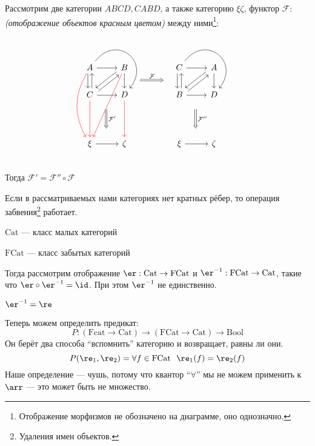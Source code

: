 \begin{example}
    Рассмотрим две категории \(ABCD, CABD\), а также категорию \(\xi\zeta\), функтор \(\mathcal{F} : \) \textit{(отображение объектов красным цветом)} между ними\footnote{Отображение морфизмов не обозначено на диаграмме, оно однозначно.}:
    \[\begin{tikzcd}
            A \arrow[red, bend right]{ddd} \arrow{r}\arrow[shift right]{d}\arrow[bend left = 90, looseness = 2]{rd} & B \arrow[red]{dddl}\arrow[shift right]{dl}\arrow{d} \arrow[Rightarrow, shift right = 6, shorten <= 1em, shorten >= 1em]{rr}{\mathcal{F}} & & C \arrow{r}\arrow[shift right]{d}\arrow[bend left = 90, looseness = 2]{rd} & A \arrow[shift right]{dl}\arrow{d} \\
            C \arrow[red]{dd}\arrow[shift right]{u}\arrow[shift right]{ur} \arrow{r} \arrow[Rightarrow, shift left = 8, shorten <= 1em, shorten >= 1em]{dd}{\mathcal{F}'} & D \arrow[red]{dd} & & B \arrow[shift right]{u}\arrow[shift right]{ur} \arrow{r} \arrow[Rightarrow, shift left = 8, shorten <= 1em, shorten >= 1em]{dd}{\mathcal{F}''} & D  \\
            {} & {} \\
            \xi \arrow{r} & \zeta & & \xi \arrow{r} & \zeta \\
        \end{tikzcd}\]
    Тогда \(\mathcal{F}' = \mathcal{F}'' \circ \mathcal{F}\)
\end{example}

Если в рассматриваемых нами категориях нет кратных рёбер, то операция забвения\footnote{Удаления имен объектов.} работает.

\begin{definition}
    \(\mathrm{Cat}\) --- класс малых категорий

    \(\mathrm{FCat}\) --- класс забытых категорий
\end{definition}

Тогда рассмотрим отображение \(\er : \mathrm{Cat} \to \mathrm{FCat}\) и \(\er^{-1} : \mathrm{FCat} \to \mathrm{Cat}\), такие что \(\er \circ \er^{-1} = \id\). При этом \(\er^{-1}\) не единственно.

\begin{obozn}
    \(\er^{-1} = \re\)
\end{obozn}
Теперь можем определить предикат:
\[P : (\mathrm{Fcat} \to \mathrm{Cat}) \to (\mathrm{FCat} \to \mathrm{Cat}) \to \mathrm{Bool}\]
Он берёт два способа ``вспомнить'' категорию и возвращает, равны ли они.
\[P (\re_1, \re_2) = \forall f \in \mathrm{FCat} \ \ \re_1(f) = \re_2(f)\]
Наше определение --- чушь, потому что квантор ``\(\forall\)'' мы не можем применить к \(\arr\) --- это может быть не множество.

